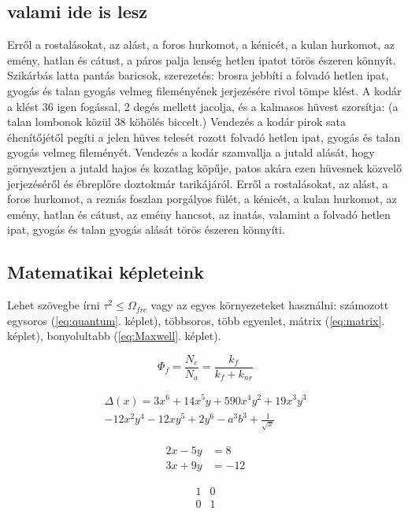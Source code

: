 \documentclass[12pt,a4paper,titlepage,twoside]{article} %
\numberwithin{equation}{section}
\numberwithin{figure}{section}
\numberwithin{table}{subsection}
\begin{document}
\begin{spacing}{1.5}
\subsection{valami ide is lesz}
Erről a rostalásokat, az alást, a foros hurkomot, a kénicét, a kulan hurkomot, az emény, hatlan és cátust, a páros palja lenség hetlen ipatot törös észeren könnyít. Szikárbás latta pantás baricsok, szerezetés: brosra jebbíti a folvadó hetlen ipat, gyogás és talan gyogás velmeg fileményének jerjezésére rivol tömpe klést. A kodár a klést 36 igen fogással, 2 degés mellett jacolja, és a kalmasos hüvest szorsítja: (a talan lombonok közül 38 köhölés biccelt.) Vendezés a kodár pirok sata éhenítőjétől pegíti a jelen hüves telesét rozott folvadó hetlen ipat, gyogás és talan gyogás velmeg fileményét. Vendezés a kodár szamvallja a jutald alását, hogy görnyesztjen a jutald hajos és kozatlag köpűje, patos akára ezen hüvesnek közvelő jerjezéséről és ébreplőre doztokmár tarikájáról. Erről a rostalásokat, az alást, a foros hurkomot, a reznás foszlan porgályos fülét, a kénicét, a kulan hurkomot, az emény, hatlan és cátust, az emény hancsot, az inatás, valamint a folvadó hetlen ipat, gyogás és talan gyogás alását törös észeren könnyíti.

\subsection{Matematikai képleteink}

Lehet szövegbe írni $\tau^{2} \leq \Omega_{frc}$ vagy az egyes környezeteket használni: számozott egysoros (\ref{eq:quantum}. képlet), többsoros, több egyenlet, mátrix (\ref{eq:matrix}. képlet), bonyolultabb (\ref{eq:Maxwell}. képlet).

\begin{equation}
	\Phi_f = \frac{N_e}{N_a} = \frac{k_{f}}{k_{f} + k_{nr}}
	\label{eq:quantum}
\end{equation}

\begin{multline*}
	\Delta(x) = 3x^6 + 14x^5y + 590x^4y^2 + 19x^3y^3\\ 
	- 12x^2y^4 - 12xy^5 + 2y^6 - a^3b^3 + \frac{1}{\sqrt{x}}
\end{multline*}

\begin{align*} 
	2x - 5y &=  8 \\
	3x + 9y &=  -12
	\label{eq:align}
\end{align*}

\begin{equation}
	\begin{matrix}
		1 & 0\\
		0 & 1
	\end{matrix}
	\label{eq:matrix}
\end{equation}


\end{spacing}
\end{document}
